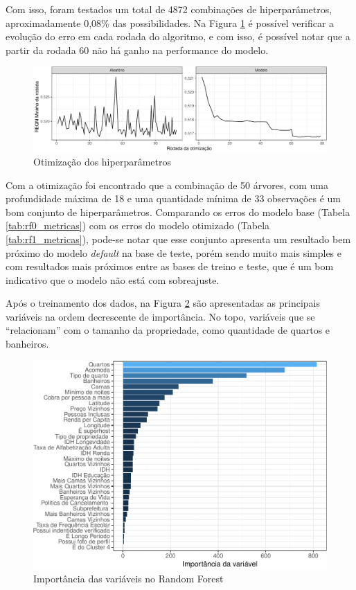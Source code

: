 \documentclass[
	12pt,				%
	a4paper,		%
	oneside,    %
	chapter=TITLE,		   %
	section=TITLE,		   %
	subsection=TITLE,	   %
	subsubsection=TITLE, %
	english,			%
	french,				%
	spanish,			%
	brazil,				%
]{abntex2}
\begin{document}
Com isso, foram testados um total de 4872 combinações de
hiperparâmetros, aproximadamente 0,08\% das possibilidades. Na Figura
\ref{otimizacao} é possível verificar a evolução do erro em cada rodada
do algoritmo, e com isso, é possível notar que a partir da rodada 60 não
há ganho na performance do modelo.

\begin{figure}
\centering
\includegraphics{00-TCC_files/figure-latex/otimizacao-1.pdf}
\caption{\label{otimizacao}Otimização dos hiperparâmetros}
\end{figure}

Com a otimização foi encontrado que a combinação de 50 árvores, com uma
profundidade máxima de 18 e uma quantidade mínima de 33 observações é um
bom conjunto de hiperparâmetros. Comparando os erros do modelo base
(Tabela \ref{tab:rf0_metricas}) com os erros do modelo otimizado (Tabela
\ref{tab:rf1_metricas}), pode-se notar que esse conjunto apresenta um
resultado bem próximo do modelo \emph{default} na base de teste, porém
sendo muito mais simples e com resultados mais próximos entre as bases
de treino e teste, que é um bom indicativo que o modelo não está com
sobreajuste.

Após o treinamento dos dados, na Figura \ref{imp_var_rf} são
apresentadas as principais variáveis na ordem decrescente de
importância. No topo, variáveis que se ``relacionam'' com o tamanho da
propriedade, como quantidade de quartos e banheiros.

\begin{figure}
\centering
\includegraphics{00-TCC_files/figure-latex/imp_var_rf-1.pdf}
\caption{\label{imp_var_rf}Importância das variáveis no Random Forest}
\end{figure}
\end{document}
